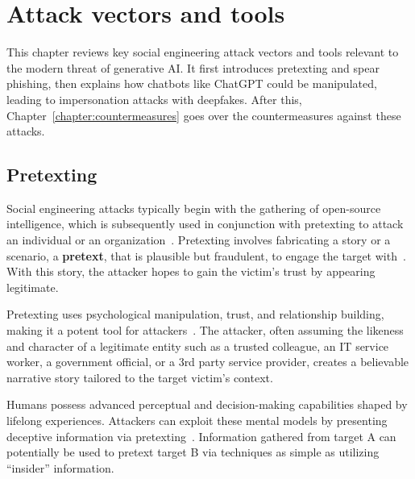 \chapter{Attack vectors and tools\label{chapter:attacks}}
\begin{comment}
\end{comment}

This chapter reviews key social engineering attack vectors and tools relevant to the modern threat of generative AI. It first introduces pretexting and spear phishing, then explains how chatbots like ChatGPT could be manipulated, leading to impersonation attacks with deepfakes. After this, Chapter~\ref{chapter:countermeasures} goes over the countermeasures against these attacks.



\section{Pretexting}
\begin{comment}
\end{comment}

%
%
Social engineering attacks typically begin with the gathering of open-source intelligence, which is subsequently used in conjunction with pretexting to attack an individual or an organization~\citep{hadnagy_Social_Engineering_The_Science_2018}. Pretexting involves fabricating a story or a scenario, a \textbf{pretext}, that is plausible but fraudulent, to engage the target with~\citep{wang_Defining_Social_Engineering_2020}. With this story, the attacker hopes to gain the victim's trust by appearing legitimate. 

%
%
Pretexting uses psychological manipulation, trust, and relationship building, making it a potent tool for attackers~\citep{mitnick_The_Art_of_Deception_2003}. The attacker, often assuming the likeness and character of a legitimate entity such as a trusted colleague, an IT service worker, a government official, or a 3rd party service provider, creates a believable narrative story tailored to the target victim's context.

%
%
Humans possess advanced perceptual and decision-making capabilities shaped by lifelong experiences. Attackers can exploit these mental models by presenting deceptive information via pretexting~\citep{mirsky_Threat_Offensive_AI_Organizations_2023}. Information gathered from target A can potentially be used to pretext target B via techniques as simple as utilizing “insider” information.







